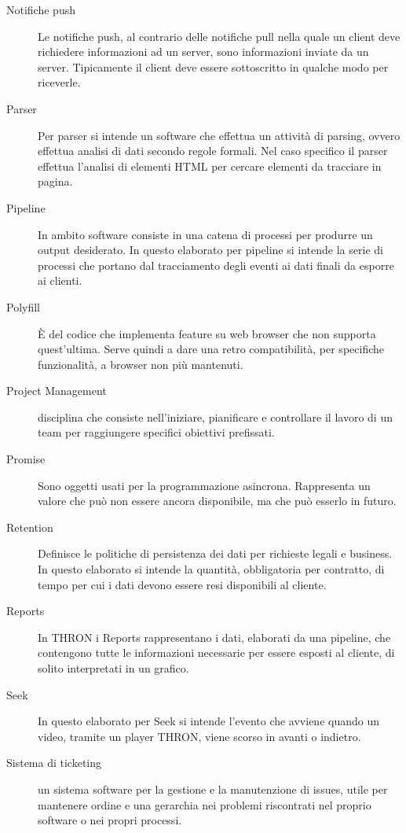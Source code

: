 \documentclass[a4paper, 12pt, twoside, openright]{book}
\begin{document}
\begin {description}
\item[Notifiche push]
Le notifiche push, al contrario delle notifiche pull nella quale un client deve richiedere informazioni ad un server, sono informazioni inviate da un server. Tipicamente il client deve essere sottoscritto in qualche modo per riceverle.

\item[Parser]
Per parser si intende un software che effettua un attività di parsing, ovvero effettua analisi di dati secondo regole formali. Nel caso specifico il parser effettua l'analisi di elementi HTML per cercare elementi da tracciare in pagina.
\item[Pipeline]
In ambito software consiste in una catena di processi per produrre un output desiderato. In questo elaborato per pipeline si intende la serie di processi che portano dal tracciamento degli eventi ai dati finali da esporre ai clienti.
\item[Polyfill]
\`{E} del codice che implementa feature su web browser che non supporta quest'ultima. Serve quindi a dare una retro compatibilità, per specifiche funzionalità, a browser non più mantenuti.
\item[Project Management]
disciplina che consiste nell'iniziare, pianificare e controllare il lavoro di un team per raggiungere specifici obiettivi prefissati.
\item[Promise]
Sono oggetti usati per la programmazione asincrona. Rappresenta un valore che può non essere ancora disponibile, ma che può esserlo in futuro.

\item[Retention]
Definisce le politiche di persistenza dei dati per richieste legali e business. In questo elaborato si intende la quantità, obbligatoria per contratto, di tempo per cui i dati devono essere resi disponibili al cliente.
\item[Reports]
In THRON i Reports rappresentano i dati, elaborati da una pipeline, che contengono tutte le informazioni necessarie per essere esposti al cliente, di solito interpretati in un grafico.

\item[Seek]
In questo elaborato per Seek si intende l'evento che avviene quando un video, tramite un player THRON, viene scorso in avanti o indietro.
\item[Sistema di ticketing]
un sistema software per la gestione e la manutenzione di issues, utile per mantenere ordine e una gerarchia nei problemi riscontrati nel proprio software o nei propri processi.


\end{description}
\end{document}
